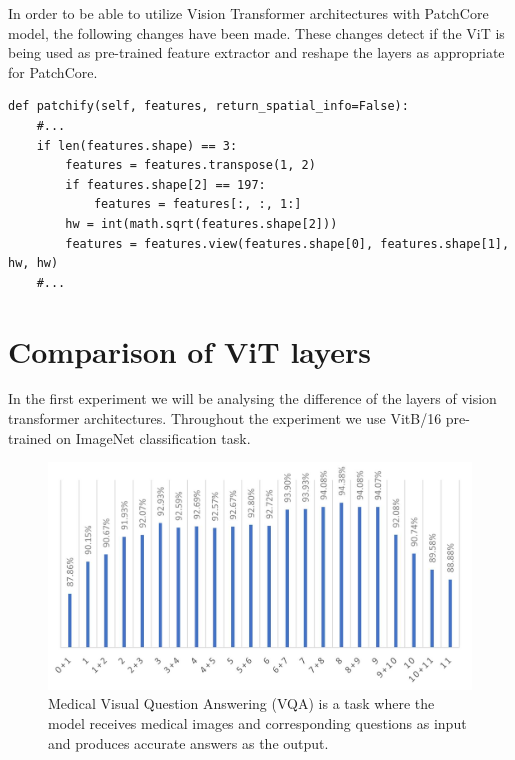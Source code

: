 In order to be able to utilize Vision Transformer architectures with PatchCore model, the following changes have been made. These changes detect if the ViT is being used as pre-trained feature extractor and reshape the layers as appropriate for PatchCore.

\begin{lstlisting}
def patchify(self, features, return_spatial_info=False):
	#...
	if len(features.shape) == 3:
		features = features.transpose(1, 2)
		if features.shape[2] == 197:
			features = features[:, :, 1:]
		hw = int(math.sqrt(features.shape[2]))
		features = features.view(features.shape[0], features.shape[1], hw, hw)
	#...
\end{lstlisting}

\section{Comparison of ViT layers}
\label{vit layers}

In the first experiment we will be analysing the difference of the layers of vision transformer architectures. Throughout the experiment we use VitB/16 pre-trained on ImageNet classification task. 

\begin{figure}[h]
	\begin{center}
		\includegraphics[width=1.0\linewidth]{Chapter_4/vit.png}
	\end{center}
	\caption{Medical Visual Question Answering (VQA) \cite{liu2021slake} is a task where the model receives medical images and corresponding questions as input and produces accurate answers as the output.}
	\label{fig:vit_layers}
\end{figure}